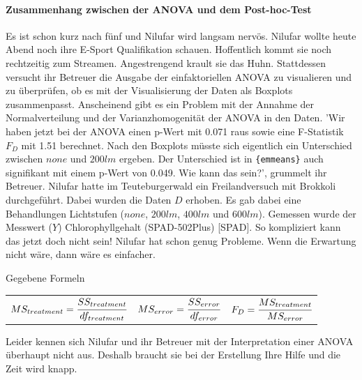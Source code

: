 \documentclass[a4paper, 9pt]{scrartcl}\usepackage[]{graphicx}\usepackage[]{xcolor}
\begin{document}
\ifcollection
\paragraph{Zusammenhang zwischen der ANOVA und dem Post-hoc-Test}
\fi

Es ist schon kurz nach fünf und Nilufar wird langsam nervös. Nilufar wollte heute Abend noch ihre E-Sport Qualifikation schauen. Hoffentlich kommt sie noch rechtzeitig zum Streamen. Angestrengend krault sie das Huhn. Stattdessen versucht ihr Betreuer die Ausgabe der einfaktoriellen ANOVA zu visualieren und zu überprüfen, ob es mit der Visualisierung der Daten als Boxplots zusammenpasst. Anscheinend gibt es ein Problem mit der Annahme der Normalverteilung und der Varianzhomogenität der ANOVA in den Daten. 'Wir haben jetzt bei der ANOVA einen p-Wert mit 0.071 raus sowie eine F-Statistik $F_D$ mit 1.51 berechnet. Nach den Boxplots müsste sich eigentlich ein Unterschied zwischen $none$ und $200lm$ ergeben. Der Unterschied ist in \texttt{\{emmeans\}} auch signifikant mit einem p-Wert von 0.049. Wie kann das sein?', grummelt ihr Betreuer. Nilufar hatte im Teuteburgerwald ein Freilandversuch mit Brokkoli durchgeführt. Dabei wurden die Daten $D$ erhoben. Es gab dabei eine Behandlungen Lichtstufen ($none$, $200lm$, $400lm$ und $600lm$). Gemessen wurde der Messwert ($Y$) Chlorophyllgehalt (SPAD-502Plus) [SPAD]. So kompliziert kann das jetzt doch nicht sein! Nilufar hat schon genug Probleme. Wenn die Erwartung nicht wäre, dann wäre es einfacher.

\begin{graybox}{Gegebene Formeln}
\begin{center}
  \begin{tabular}{ccc}
    $MS_{treatment} = \cfrac{SS_{treatment}}{df_{treatment}}$ &
    $MS_{error} = \cfrac{SS_{error}}{df_{error}}$ &
    $F_{D} = \cfrac{MS_{treatment}}{MS_{error}}$ \\
  \end{tabular}
\end{center}
\end{graybox}

Leider kennen sich Nilufar und ihr Betreuer mit der Interpretation einer ANOVA überhaupt nicht aus. Deshalb braucht sie bei der Erstellung Ihre Hilfe und die Zeit wird knapp. 
\end{document}
